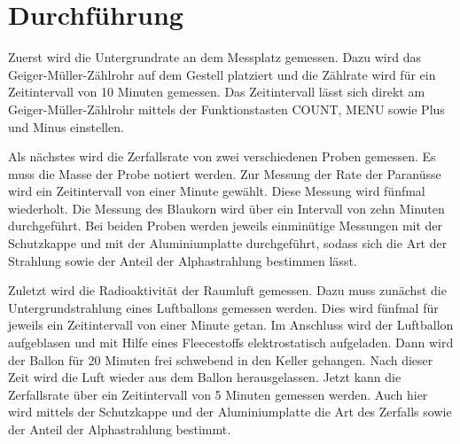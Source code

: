 \section{Durchführung}
\label{sec:Durchführung}

Zuerst wird die Untergrundrate an dem Messplatz gemessen. Dazu wird das Geiger-Müller-Zählrohr auf dem 
Gestell platziert und die Zählrate wird für ein Zeitintervall von 10 Minuten gemessen.
Das Zeitintervall lässt sich direkt am Geiger-Müller-Zählrohr mittels der Funktionstasten COUNT, MENU sowie Plus und Minus einstellen.

Als nächstes wird die Zerfallsrate von zwei verschiedenen Proben gemessen. Es muss die Masse 
der Probe notiert werden. Zur Messung der Rate der Paranüsse wird ein Zeitintervall von einer Minute gewählt. 
Diese Messung wird fünfmal wiederholt. Die Messung des Blaukorn wird über ein Intervall von 
zehn Minuten durchgeführt. Bei beiden Proben werden jeweils einminütige Messungen mit der Schutzkappe und mit 
der Aluminiumplatte durchgeführt, sodass sich die Art der Strahlung sowie der Anteil der 
Alphastrahlung bestimmen lässt.

Zuletzt wird die Radioaktivität der Raumluft gemessen. Dazu muss zunächst die Untergrundstrahlung eines 
Luftballons gemessen werden. Dies wird fünfmal für jeweils ein Zeitintervall von einer Minute getan. Im Anschluss 
wird der Luftballon aufgeblasen und mit Hilfe eines Fleecestoffs elektrostatisch aufgeladen. Dann wird der Ballon für 20 Minuten frei 
schwebend in den Keller gehangen. Nach dieser Zeit wird die Luft wieder aus dem Ballon herausgelassen. Jetzt kann die Zerfallsrate 
über ein Zeitintervall von 5 Minuten gemessen werden. Auch hier wird mittels der Schutzkappe und der Aluminiumplatte die Art des Zerfalls sowie 
der Anteil der Alphastrahlung bestimmt. 